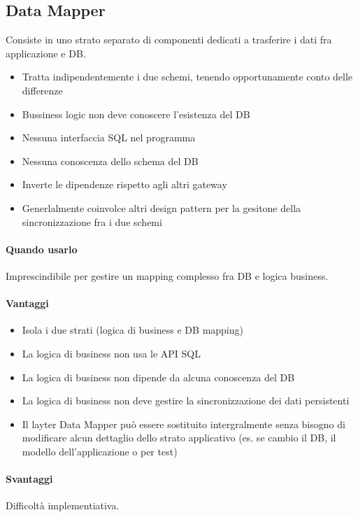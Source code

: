\subsection{Data Mapper}
Consiste in uno strato separato di componenti dedicati a trasferire i dati fra applicazione e DB.
\begin{itemize}
    \item Tratta indipendentemente i due schemi, tenendo opportunamente conto delle differenze
    \item Bussiness logic non deve conoscere l'esistenza del DB
    \item Nessuna interfaccia SQL nel programma
    \item Nessuna conoscenza dello schema del DB
    \item Inverte le dipendenze rispetto agli altri gateway
    \item Generlalmente coinvolce altri design pattern per la gesitone della sincronizzazione 
    fra i due schemi
\end{itemize}
\paragraph*{Quando usarlo} Imprescindibile per gestire un mapping complesso fra DB e logica business.
\paragraph*{Vantaggi}
\begin{itemize}
    \item Isola i due strati (logica di business e DB mapping)
    \item La logica di business non usa le API SQL
    \item La logica di business non dipende da alcuna conoscenza del DB
    \item La logica di business non deve gestire la sincronizzazione dei dati persistenti
    \item Il layter Data Mapper può essere sostituito intergralmente senza bisogno di modificare
    alcun dettaglio dello strato applicativo (es. se cambio il DB, il modello dell'applicazione o per test)
\end{itemize}
\paragraph*{Svantaggi}
Difficoltà implementiativa.